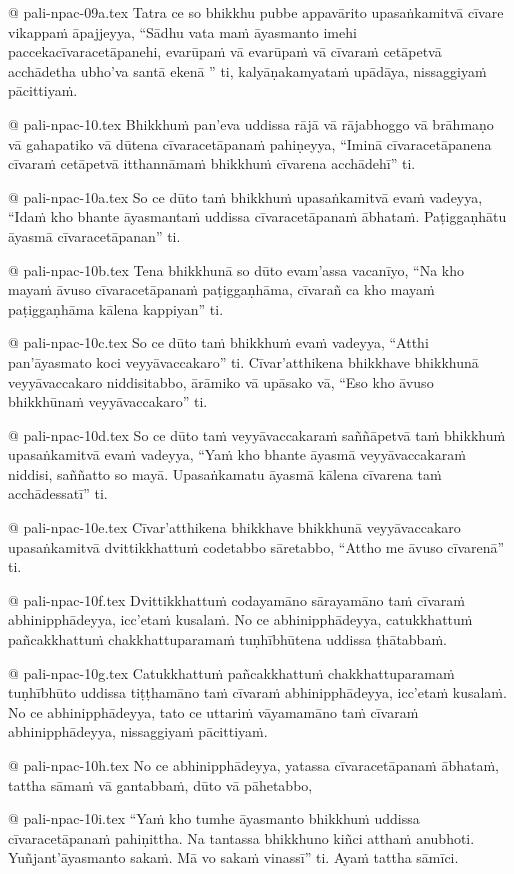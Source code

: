 @ pali-npac-09a.tex
Tatra ce so bhikkhu pubbe appavārito upasaṅkamitvā cīvare vikappaṁ āpajjeyya, “Sādhu vata maṁ āyasmanto imehi paccekacīvaracetāpanehi, evarūpaṁ vā evarūpaṁ vā cīvaraṁ cetāpetvā acchādetha ubho’va santā ekenā ” ti, kalyāṇakamyataṁ upādāya, nissaggiyaṁ pācittiyaṁ.

@ pali-npac-10.tex
Bhikkhuṁ pan’eva uddissa rājā vā rājabhoggo vā brāhmaṇo vā gahapatiko vā dūtena cīvaracetāpanaṁ pahiṇeyya, “Iminā cīvaracetāpanena cīvaraṁ cetāpetvā itthannāmaṁ bhikkhuṁ cīvarena acchādehī” ti.

@ pali-npac-10a.tex
So ce dūto taṁ bhikkhuṁ upasaṅkamitvā evaṁ vadeyya, “Idaṁ kho bhante āyasmantaṁ uddissa cīvaracetāpanaṁ ābhataṁ. Paṭiggaṇhātu āyasmā cīvaracetāpanan” ti.

@ pali-npac-10b.tex
Tena bhikkhunā so dūto evam’assa vacanīyo, “Na kho mayaṁ āvuso cīvaracetāpanaṁ paṭiggaṇhāma, cīvarañ ca kho mayaṁ paṭiggaṇhāma kālena kappiyan” ti.

@ pali-npac-10c.tex
So ce dūto taṁ bhikkhuṁ evaṁ vadeyya, “Atthi pan’āyasmato koci veyyāvaccakaro” ti. Cīvar’atthikena bhikkhave bhikkhunā veyyāvaccakaro niddisitabbo, ārāmiko vā upāsako vā, “Eso kho āvuso bhikkhūnaṁ veyyāvaccakaro” ti.

@ pali-npac-10d.tex
So ce dūto taṁ veyyāvaccakaraṁ saññāpetvā taṁ bhikkhuṁ upasaṅkamitvā evaṁ vadeyya, “Yaṁ kho bhante āyasmā veyyāvaccakaraṁ niddisi, saññatto so mayā. Upasaṅkamatu āyasmā kālena cīvarena taṁ acchādessatī” ti. 

@ pali-npac-10e.tex
Cīvar’atthikena bhikkhave bhikkhunā veyyāvaccakaro upasaṅkamitvā dvittikkhattuṁ codetabbo sāretabbo, “Attho me āvuso cīvarenā” ti.

@ pali-npac-10f.tex
Dvittikkhattuṁ codayamāno sārayamāno taṁ cīvaraṁ abhinipphādeyya, icc’etaṁ kusalaṁ. No ce abhinipphādeyya, catukkhattuṁ pañcakkhattuṁ chakkhattuparamaṁ tuṇhībhūtena uddissa ṭhātabbaṁ.

@ pali-npac-10g.tex
Catukkhattuṁ pañcakkhattuṁ chakkhattuparamaṁ tuṇhībhūto uddissa tiṭṭhamāno taṁ cīvaraṁ abhinipphādeyya, icc’etaṁ kusalaṁ. No ce abhinipphādeyya, tato ce uttariṁ vāyamamāno taṁ cīvaraṁ abhinipphādeyya, nissaggiyaṁ pācittiyaṁ.

@ pali-npac-10h.tex
No ce abhinipphādeyya, yatassa cīvaracetāpanaṁ ābhataṁ, tattha sāmaṁ vā gantabbaṁ, dūto vā pāhetabbo,

@ pali-npac-10i.tex
“Yaṁ kho tumhe āyasmanto bhikkhuṁ uddissa cīvaracetāpanaṁ pahiṇittha. Na tantassa bhikkhuno kiñci atthaṁ anubhoti. Yuñjant’āyasmanto sakaṁ. Mā vo sakaṁ vinassī” ti. Ayaṁ tattha sāmīci.

